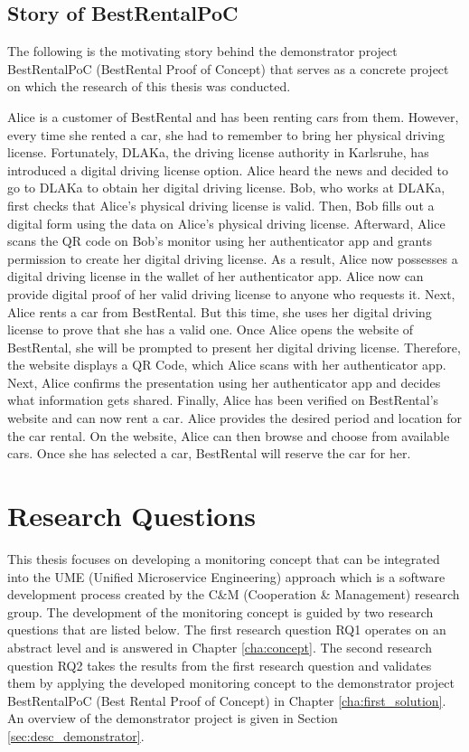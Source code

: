 \subsection*{Story of BestRentalPoC}
\label{subsec:story}

The following is the motivating story behind the demonstrator project BestRentalPoC
(BestRental Proof of Concept) that serves as a concrete project
on which the research of this thesis was conducted.

Alice is a customer of BestRental and has been renting cars from them.
However, every time she rented a car, she had to remember to bring her physical driving license.
Fortunately, DLAKa, the driving license authority in Karlsruhe, 
has introduced a digital driving license option. Alice heard the news and decided to go
to DLAKa to obtain her digital driving license. Bob, who works at DLAKa,
first checks that Alice's physical driving license is valid. Then, Bob fills out a digital form
using the data on Alice's physical driving license. Afterward, Alice scans the QR code on Bob's monitor
using her authenticator app and grants permission to create her digital driving license.
As a result, Alice now possesses a digital driving license in the wallet of her authenticator app.
Alice now can provide digital proof of her valid driving license to anyone who requests it.
Next, Alice rents a car from BestRental. But this time, she uses her digital driving license
to prove that she has a valid one. Once Alice opens the website of BestRental,
she will be prompted to present her digital driving license. Therefore, the website displays a QR Code,
which Alice scans with her authenticator app. Next, Alice confirms the presentation using
her authenticator app and decides what information gets shared. 
Finally, Alice has been verified on BestRental's website and can now rent a car. 
Alice provides the desired period and location for the car rental.
On the website, Alice can then browse and choose from available cars.
Once she has selected a car, BestRental will reserve the car for her.

\section{Research Questions}
\label{sec:rq}

This thesis focuses on developing a monitoring concept that can be integrated into the UME (Unified Microservice Engineering)
approach which is a software development process created by the C\&M (Cooperation \& Management) research group.
The development of the monitoring concept is guided by two research questions that are listed below.
The first research question RQ1 operates on an abstract level and is answered in Chapter \ref{cha:concept}.
The second research question RQ2 takes the results from the first research question and validates them by applying
the developed monitoring concept to the demonstrator project BestRentalPoC (Best Rental Proof of Concept) in Chapter \ref{cha:first_solution}.
An overview of the demonstrator project is given in Section \ref{sec:desc_demonstrator}.


